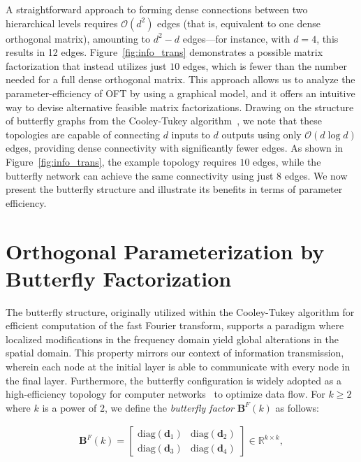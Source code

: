 A straightforward approach to forming dense connections between two hierarchical levels requires $\mathcal{O}(d^2)$ edges (that is, equivalent to one dense orthogonal matrix), amounting to $d^2-d$ edges—for instance, with $d=4$, this results in 12 edges. Figure~\ref{fig:info_trans} demonstrates a possible matrix factorization that instead utilizes just $10$ edges, which is fewer than the number needed for a full dense orthogonal matrix. This approach allows us to analyze the parameter-efficiency of OFT by using a graphical model, and it offers an intuitive way to devise alternative feasible matrix factorizations. Drawing on the structure of butterfly graphs from the Cooley-Tukey algorithm~\cite{cooley1965algorithm}, we note that these topologies are capable of connecting $d$ inputs to $d$ outputs using only $\mathcal{O}(d\log d)$ edges, providing dense connectivity with significantly fewer edges. As shown in Figure~\ref{fig:info_trans}, the example topology requires $10$ edges, while the butterfly network can achieve the same connectivity using just $8$ edges. We now present the butterfly structure and illustrate its benefits in terms of parameter efficiency.

\section{Orthogonal Parameterization by Butterfly Factorization}

The butterfly structure, originally utilized within the Cooley-Tukey algorithm for efficient computation of the fast Fourier transform, supports a paradigm where localized modifications in the frequency domain yield global alterations in the spatial domain. This property mirrors our context of information transmission, wherein each node at the initial layer is able to communicate with every node in the final layer. Furthermore, the butterfly configuration is widely adopted as a high-efficiency topology for computer networks~\cite{solihin2015fundamentals,li2011linear} to optimize data flow. For $k\geq 2$ where $k$ is a power of $2$, we define the \emph{butterfly factor} $\bm{B}^F(k)$ as follows:

\begin{equation}\label{eq:but_factor}
\begin{aligned}
    \bm{B}^F(k)=\begin{bmatrix}
    \text{diag}(\bm{d}_1) & \text{diag}(\bm{d}_2) \\
    \text{diag}(\bm{d}_3) & \text{diag}(\bm{d}_4)
    \end{bmatrix}\in\mathbb{R}^{k\times k},
\end{aligned}
\end{equation}

